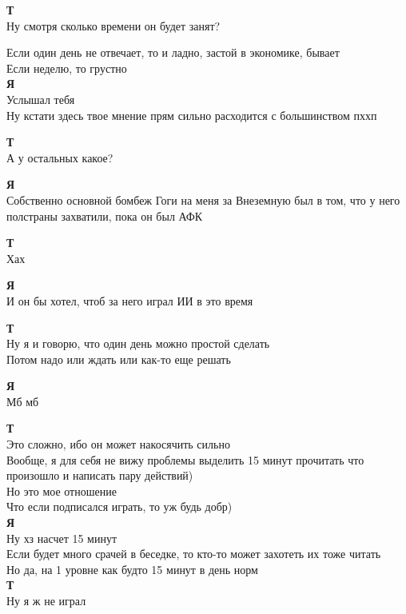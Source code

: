 \textbf{Т} \\
Ну смотря сколько времени он будет занят?

Если один день не отвечает, то и ладно, застой в экономике, бывает\\

Если неделю, то грустно\\

\textbf{Я} \\
Услышал тебя \\
Ну кстати здесь твое мнение прям сильно расходится с большинством пххп

\textbf{Т} \\
А у остальных какое?

\textbf{Я} \\
Собственно основной бомбеж Гоги на меня за Внеземную был в том, что у него полстраны захватили, пока он был АФК

\textbf{Т} \\
Хах

\textbf{Я} \\
И он бы хотел, чтоб за него играл ИИ в это время

\textbf{Т} \\
Ну я и говорю, что один день можно простой сделать \\
Потом надо или ждать или как-то еще решать

\textbf{Я} \\
Мб мб

\textbf{Т} \\
Это сложно, ибо он может накосячить сильно\\

Вообще, я для себя не вижу проблемы выделить 15 минут прочитать что произошло и написать пару действий)\\
Но это мое отношение\\

Что если подписался играть, то уж будь добр)\\

\textbf{Я} \\
Ну хз насчет 15 минут\\

Если будет много срачей в беседке, то кто-то может захотеть их тоже читать\\

Но да, на 1 уровне как будто 15 минут в день норм\\

\textbf{Т} \\
Ну я ж не играл

